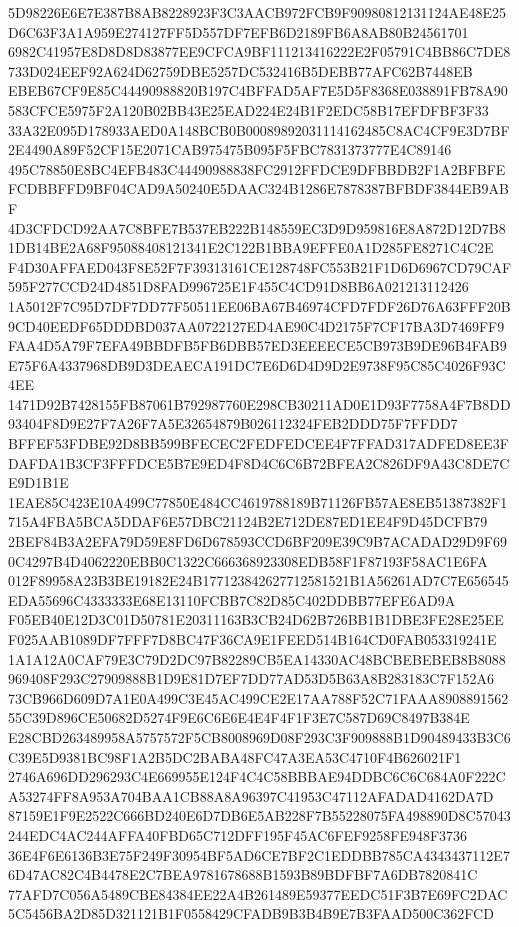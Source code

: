 \documentclass[UTF8,fontset=fandol,zihao=-4,a4paper]{ctexart}
\begin{document}
{{5D98226E6E7E387B8AB8228923F3C3AACB972FCB9F90980812131124AE48E25D6C63F3A1A959E274127FF5D557DF7EFB6D2189FB6A8AB80B24561701
6982C41957E8D8D8D83877EE9CFCA9BF111213416222E2F05791C4BB86C7DE8733D024EEF92A624D62759DBE5257DC532416B5DEBB77AFC62B7448EB
EBEB67CF9E85C44490988820B197C4BFFAD5AF7E5D5F8368E038891FB78A90583CFCE5975F2A120B02BB43E25EAD224E24B1F2EDC58B17EFDFBF3F33
33A32E095D178933AED0A148BCB0B00089892031114162485C8AC4CF9E3D7BF2E4490A89F52CF15E2071CAB975475B095F5FBC7831373777E4C89146
495C78850E8BC4EFB483C44490988838FC2912FFDCE9DFBBDB2F1A2BFBFEFCDBBFFD9BF04CAD9A50240E5DAAC324B1286E7878387BFBDF3844EB9ABF
4D3CFDCD92AA7C8BFE7B537EB222B148559EC3D9D959816E8A872D12D7B81DB14BE2A68F95088408121341E2C122B1BBA9EFFE0A1D285FE8271C4C2E
F4D30AFFAED043F8E52F7F39313161CE128748FC553B21F1D6D6967CD79CAF595F277CCD24D4851D8FAD996725E1F455C4CD91D8BB6A021213112426
1A5012F7C95D7DF7DD77F50511EE06BA67B46974CFD7FDF26D76A63FFF20B9CD40EEDF65DDDBD037AA0722127ED4AE90C4D2175F7CF17BA3D7469FF9
FAA4D5A79F7EFA49BBDFB5FB6DBB57ED3EEEECE5CB973B9DE96B4FAB9E75F6A4337968DB9D3DEAECA191DC7E6D6D4D9D2E9738F95C85C4026F93C4EE
1471D92B7428155FB87061B792987760E298CB30211AD0E1D93F7758A4F7B8DD93404F8D9E27F7A26F7A5E32654879B026112324FEB2DDD75F7FFDD7
BFFEF53FDBE92D8BB599BFECEC2FEDFEDCEE4F7FFAD317ADFED8EE3FDAFDA1B3CF3FFFDCE5B7E9ED4F8D4C6C6B72BFEA2C826DF9A43C8DE7CE9D1B1E
1EAE85C423E10A499C77850E484CC4619788189B71126FB57AE8EB51387382F1715A4FBA5BCA5DDAF6E57DBC21124B2E712DE87ED1EE4F9D45DCFB79
2BEF84B3A2EFA79D59E8FD6D678593CCD6BF209E39C9B7ACADAD29D9F690C4297B4D4062220EBB0C1322C666368923308EDB58F1F87193F58AC1E6FA
012F89958A23B3BE19182E24B177123842627712581521B1A56261AD7C7E656545EDA55696C4333333E68E13110FCBB7C82D85C402DDBB77EFE6AD9A
F05EB40E12D3C01D50781E20311163B3CB24D62B726BB1B1DBE3FE28E25EEF025AAB1089DF7FFF7D8BC47F36CA9E1FEED514B164CD0FAB053319241E
1A1A12A0CAF79E3C79D2DC97B82289CB5EA14330AC48BCBEBEBEB8B8088969408F293C27909888B1D9E81D7EF7DD77AD53D5B63A8B283183C7F152A6
73CB966D609D7A1E0A499C3E45AC499CE2E17AA788F52C71FAAA890889156255C39D896CE50682D5274F9E6C6E6E4E4F4F1F3E7C587D69C8497B384E
E28CBD263489958A5757572F5CB8008969D08F293C3F909888B1D90489433B3C6C39E5D9381BC98F1A2B5DC2BABA48FC47A3EA53C4710F4B626021F1
2746A696DD296293C4E669955E124F4C4C58BBBAE94DDBC6C6C684A0F222CA53274FF8A953A704BAA1CB88A8A96397C41953C47112AFADAD4162DA7D
87159E1F9E2522C666BD240E6D7DB6E5AB228F7B55228075FA498890D8C57043244EDC4AC244AFFA40FBD65C712DFF195F45AC6FEF9258FE948F3736
36E4F6E6136B3E75F249F30954BF5AD6CE7BF2C1EDDBB785CA4343437112E76D47AC82C4B4478E2C7BEA9781678688B1593B89BDFBF7A6DB7820841C
77AFD7C056A5489CBE84384EE22A4B261489E59377EEDC51F3B7E69FC2DAC5C5456BA2D85D321121B1F0558429CFADB9B3B4B9E7B3FAAD500C362FCD
}}
\end{document}
